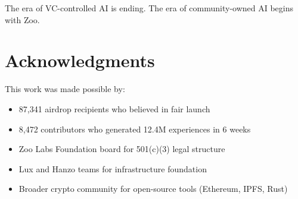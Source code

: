 \documentclass[11pt,letterpaper]{article}
\theoremstyle{definition}
\theoremstyle{remark}
\begin{document}
The era of VC-controlled AI is ending. The era of community-owned AI begins with Zoo.

\section*{Acknowledgments}

This work was made possible by:
\begin{itemize}
\item 87,341 airdrop recipients who believed in fair launch
\item 8,472 contributors who generated 12.4M experiences in 6 weeks
\item Zoo Labs Foundation board for 501(c)(3) legal structure
\item Lux and Hanzo teams for infrastructure foundation
\item Broader crypto community for open-source tools (Ethereum, IPFS, Rust)
\end{itemize}
\end{document}
